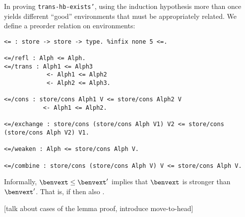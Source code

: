 In proving \texttt{trans-hb-exists'}, using the induction hypothesis more than once yields different ``good'' environments that must be appropriately related.
We define a preorder relation on environments:
\begin{verbatim}
<= : store -> store -> type. %infix none 5 <=.

<=/refl : Alph <= Alph.
<=/trans : Alph1 <= Alph3
            <- Alph1 <= Alph2
            <- Alph2 <= Alph3.

<=/cons : store/cons Alph1 V <= store/cons Alph2 V
           <- Alph1 <= Alph2.

<=/exchange : store/cons (store/cons Alph V1) V2 <= store/cons (store/cons Alph V2) V1.

<=/weaken : Alph <= store/cons Alph V.

<=/combine : store/cons (store/cons Alph V) V <= store/cons Alph V.
\end{verbatim}
Informally, $\benvext \leq \benvext'$ implies that $\benvext$ is stronger than $\benvext'$.
That is, if \trahb{}{\benvext}{\bexp}{\hexp} then also .

[talk about cases of the lemma proof, introduce move-to-head]


